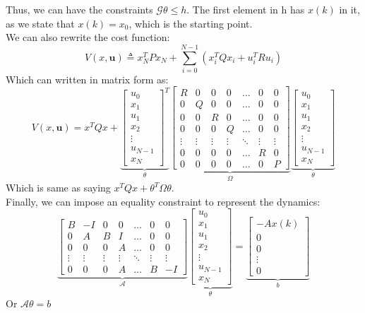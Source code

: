 \documentclass{article}
\begin{document}
Thus, we can have the constraints $\mathcal{G} \theta \leq h$. The first element in h has $x(k)$ in it, as we state that $x(k) = x_0$, which is the starting point. \\
We can also rewrite the cost function:
\[
V(x, \textbf{u}) \triangleq x_N^TPx_N + \sum_{i=0}^{N-1}\left(x_i^TQx_i + u_i^TRu_i \right)
\]
Which can written in matrix form as:
\[
V(x, \textbf{u}) = x^TQx + 
\underbrace{\begin{bmatrix}
    u_0 \\ x_1 \\ u_1 \\ x_2 \\ \vdots \\ u_{N-1} \\ x_N
\end{bmatrix}^T}_{\theta}
\underbrace{\begin{bmatrix}
    R & 0 & 0 & 0 & \hdots & 0 & 0 \\
    0 & Q & 0 & 0 & \hdots & 0 & 0 \\
    0 & 0& R & 0 & \hdots & 0 & 0 \\
    0 & 0 & 0 & Q & \hdots & 0 & 0 \\
    \vdots & \vdots & \vdots & \vdots & \ddots & \vdots & \vdots \\
    0 & 0 & 0 & 0 & \hdots & R & 0 \\
    0 & 0 & 0 & 0 & \hdots & 0 & P 
\end{bmatrix}}_{\Omega}
\underbrace{\begin{bmatrix}
    u_0 \\ x_1 \\ u_1 \\ x_2 \\ \vdots \\ u_{N-1} \\ x_N
\end{bmatrix}}_{\theta}
\]
Which is same as saying $x^TQx + \theta^T\Omega \theta$. \\
Finally, we can impose an equality constraint to represent the dynamics:
\[
\underbrace{\begin{bmatrix}
    B & -I & 0 & 0 & \hdots & 0 & 0 \\
    0 & A & B & I & \hdots & 0 & 0 \\
0& 0& 0 & A & \hdots & 0 & 0 \\
\vdots & \vdots & \vdots & \vdots & \ddots & \vdots & \vdots  \\
0& 0& 0 & A & \hdots & B & -I
\end{bmatrix}}_{\mathcal{A}}
\underbrace{\begin{bmatrix}
    u_0 \\ x_1 \\ u_1 \\ x_2 \\ \vdots \\ u_{N-1} \\ x_N
\end{bmatrix}}_{\theta} =
\underbrace{\begin{bmatrix}
    -Ax(k) \\ 0 \\ 0 \\ \vdots \\ 0
\end{bmatrix}}_{b}
\]
Or $\mathcal{A} \theta = b$
\end{document}
